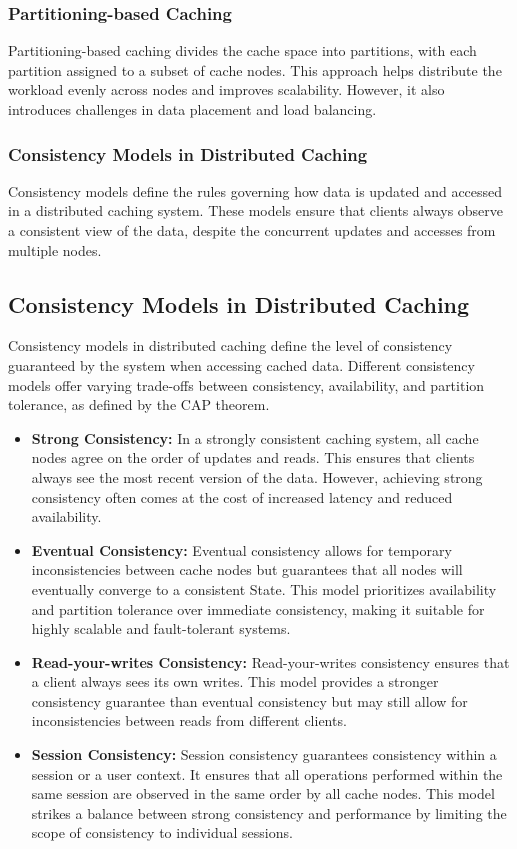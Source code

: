 \documentclass[12pt]{book} %
\begin{document}
\subsubsection{Partitioning-based Caching}
Partitioning-based caching divides the cache space into partitions, with each partition assigned to a subset of cache nodes. This approach helps distribute the workload evenly across nodes and improves scalability. However, it also introduces challenges in data placement and load balancing.

\subsubsection{Consistency Models in Distributed Caching}
Consistency models define the rules governing how data is updated and accessed in a distributed caching system. These models ensure that clients always observe a consistent view of the data, despite the concurrent updates and accesses from multiple nodes.

\subsection{Consistency Models in Distributed Caching}

Consistency models in distributed caching define the level of consistency guaranteed by the system when accessing cached data. Different consistency models offer varying trade-offs between consistency, availability, and partition tolerance, as defined by the CAP theorem.

\begin{itemize}
    \item \textbf{Strong Consistency:} In a strongly consistent caching system, all cache nodes agree on the order of updates and reads. This ensures that clients always see the most recent version of the data. However, achieving strong consistency often comes at the cost of increased latency and reduced availability.
    
    \item \textbf{Eventual Consistency:} Eventual consistency allows for temporary inconsistencies between cache nodes but guarantees that all nodes will eventually converge to a consistent State. This model prioritizes availability and partition tolerance over immediate consistency, making it suitable for highly scalable and fault-tolerant systems.
    
    \item \textbf{Read-your-writes Consistency:} Read-your-writes consistency ensures that a client always sees its own writes. This model provides a stronger consistency guarantee than eventual consistency but may still allow for inconsistencies between reads from different clients.
    
    \item \textbf{Session Consistency:} Session consistency guarantees consistency within a session or a user context. It ensures that all operations performed within the same session are observed in the same order by all cache nodes. This model strikes a balance between strong consistency and performance by limiting the scope of consistency to individual sessions.
\end{itemize}
\end{document}
